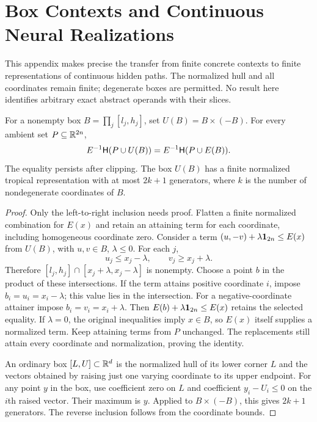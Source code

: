 \section{Box Contexts and Continuous Neural Realizations}\label{app:neural-transfer}
This appendix makes precise the transfer from finite concrete contexts to finite representations of continuous hidden paths. The normalized hull and all coordinates remain finite; degenerate boxes are permitted. No result here identifies arbitrary exact abstract operands with their slices.

\begin{lemma}\label{lem:box-context}
For a nonempty box $B=\prod_j[l_j,h_j]$, set $U(B)=B\times(-B)$. For every ambient set $P\subseteq\mathbb R^{2n}$,
\[
E^{-1}\mathsf H(P\cup U(B))=E^{-1}\mathsf H(P\cup E(B)).
\]
The equality persists after clipping. The box $U(B)$ has a finite normalized tropical representation with at most $2k+1$ generators, where $k$ is the number of nondegenerate coordinates of $B$.
\end{lemma}
\begin{proof}
Only the left-to-right inclusion needs proof. Flatten a finite normalized combination for $E(x)$ and retain an attaining term for each coordinate, including homogeneous coordinate zero. Consider a term $(u,-v)+\lambda\mathbf 1_{2n}\le E(x)$ from $U(B)$, with $u,v\in B$, $\lambda\le0$. For each $j$,
\[
u_j\le x_j-\lambda,\qquad v_j\ge x_j+\lambda.
\]
Therefore $[l_j,h_j]\cap[x_j+\lambda,x_j-\lambda]$ is nonempty. Choose a point $b$ in the product of these intersections. If the term attains positive coordinate $i$, impose $b_i=u_i=x_i-\lambda$; this value lies in the intersection. For a negative-coordinate attainer impose $b_i=v_i=x_i+\lambda$. Then $E(b)+\lambda\mathbf 1_{2n}\le E(x)$ retains the selected equality. If $\lambda=0$, the original inequalities imply $x\in B$, so $E(x)$ itself supplies a normalized term. Keep attaining terms from $P$ unchanged. The replacements still attain every coordinate and normalization, proving the identity.

An ordinary box $[L,U]\subset\mathbb R^d$ is the normalized hull of its lower corner $L$ and the vectors obtained by raising just one varying coordinate to its upper endpoint. For any point $y$ in the box, use coefficient zero on $L$ and coefficient $y_i-U_i\le0$ on the $i$th raised vector. Their maximum is $y$. Applied to $B\times(-B)$, this gives $2k+1$ generators. The reverse inclusion follows from the coordinate bounds.
\end{proof}

